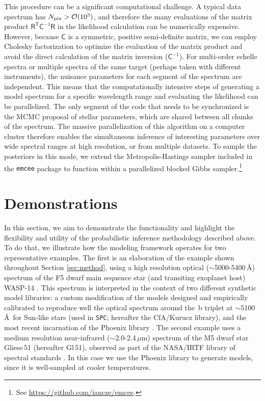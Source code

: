 \documentclass[iop,floatfix,numberedappendix,twocolappendix]{emulateapj}
\newcommand{\vR}{\mathsf{R}}
\newcommand{\vC}{\mathsf{C}}
\newcommand{\trans}{\mathsf{T}}
\begin{document}
This procedure can be a significant computational challenge.  A typical data spectrum has $N_{\rm 
pix} > \mathcal{O}(10^3)$, and therefore the many evaluations of the matrix product $\vR^{\trans} 
\vC^{-1} \vR$ in the likelihood calculation can be numerically expensive.  However, because $\vC$ 
is a symmetric, positive semi-definite matrix, we can employ Cholesky factorization to optimize the 
evaluation of the matrix product and avoid the direct calculation of the matrix inversion 
($\vC^{-1}$).  For multi-order echelle spectra or multiple spectra of the same target (perhaps 
taken with different instruments), the nuisance parameters for each segment of the spectrum are 
independent. This means that the computationally intensive steps of generating a model spectrum
for a specific wavelength range and evaluating the likelihood can be parallelized. The only segment 
of the code that needs to be synchronized is the MCMC proposal of stellar parameters, which are 
shared between all chunks of the spectrum.  The massive parallelization of this algorithm on a 
computer cluster therefore enables the simultaneous inference of interesting parameters over wide 
spectral ranges at high resolution, or from multiple datasets.  To sample the posteriors in this 
mode, we extend the Metropolis-Hastings sampler included in the {\tt emcee} package 
\citep{foreman-mackey13} to function within a parallelized blocked Gibbs 
sampler.\footnote{See \url{https://github.com/iancze/emcee}.}\\


\section{Demonstrations} \label{sec:examples}

In this section, we aim to demonstrate the functionality and highlight the flexibility and utility 
of the probabilistic inference methodology described above.  To do that, we illustrate how the 
modeling framework operates for two representative examples.  The first is an elaboration of the 
example shown throughout Section \ref{sec:method}, using a high resolution optical 
($\sim$5000-5400\,\AA) spectrum of the F5 dwarf main sequence star (and transiting exoplanet host) 
WASP-14 \citep{joshi09,torres12}.  This spectrum is interpreted in the context of two different 
synthetic model libraries: a custom modification of the \citet{castelli04} models designed and 
empirically calibrated to reproduce well the optical spectrum around the \,b triplet at 
$\sim$5100\,\AA\ for Sun-like stars (used in {\tt SPC}; hereafter the {\sc CfA/Kurucz} library), 
and the most recent incarnation of the {\sc Phoenix} library \citep{husser13}.  The second 
example uses a medium resolution near-infrared ($\sim$2.0-2.4\,$\mu$m) spectrum of the M5 dwarf 
star Gliese\,51 (hereafter Gl\,51), observed as part of the NASA/IRTF library of spectral standards 
\citep{cushing05,rayner09}.  In this case we use the {\sc Phoenix} library to generate models, 
since it is well-sampled at cooler temperatures.
\end{document}
